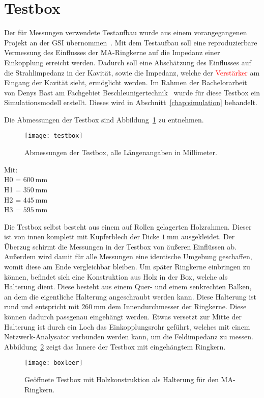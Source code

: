 \section{Testbox}
\label{sec:testbox}
Der f\"ur Messungen verwendete Testaufbau wurde aus einem vorangegangenen Projekt an der GSI \"ubernommen~\citep{harzheim2016modeling}. Mit dem Testaufbau soll eine reproduzierbare Vermessung des Einflusses der MA-Ringkerne auf die Impedanz einer Einkopplung erreicht werden. Dadurch soll eine Absch\"atzung des Einflusses auf die Strahlimpedanz in der Kavit\"at, sowie die Impedanz, welche der \textcolor{red}{Verst\"arker} am Eingang der Kavit\"at sieht, erm\"oglicht werden. Im Rahmen der Bachelorarbeit von Denys Bast am Fachgebiet Beschleunigertechnik~\citep{bast2017ba} wurde f\"ur diese Testbox ein Simulationsmodell erstellt. Dieses wird in Abschnitt~\ref{chap:simulation} behandelt.

\par
Die Abmessungen der Testbox sind Abbildung~\ref{fig:boxdimensions} zu entnehmen.
\par
\begin{figure}[htb]
	\centering
	\texttt{[image: testbox]}
	\caption{Abmessungen der Testbox, alle L\"angenangaben in Millimeter.}
	\label{fig:boxdimensions}
\end{figure}
Mit:\\
H0 = $\SI{600}{\milli\meter}$\\
H1 = $\SI{350}{\milli\meter}$\\
H2 = $\SI{445}{\milli\meter}$\\
H3 = $\SI{595}{\milli\meter}$

Die Testbox selbst besteht aus einem auf Rollen gelagerten Holzrahmen. Dieser ist von innen komplett mit Kupferblech der Dicke $\SI{1}{\milli\meter}$ ausgekleidet. Der Überzug schirmt die Messungen in der Testbox von \"au\ss{}eren Einfl\"ussen ab. Au\ss{}erdem wird damit f\"ur alle Messungen eine identische Umgebung geschaffen, womit diese am Ende vergleichbar bleiben. Um sp\"ater Ringkerne einbringen zu k\"onnen, befindet sich eine Konstruktion aus Holz in der Box, welche als Halterung dient. Diese besteht aus einem Quer- und einem senkrechten Balken, an dem die eigentliche Halterung angeschraubt werden kann. Diese Halterung ist rund und entspricht mit $\SI{260}{\milli\meter}$ dem Innendurchmesser der Ringkerne. Diese k\"onnen dadurch passgenau eingeh\"angt werden. Etwas versetzt zur Mitte der Halterung ist durch ein Loch das Einkopplungsrohr gef\"uhrt, welches mit einem Netzwerk-Analysator verbunden werden kann, um die Feldimpedanz zu messen. Abbildung~\ref{fig:leereBox} zeigt das Innere der Testbox mit eingeh\"angtem Ringkern. 
\par
\begin{figure}[htb]
	\centering
	\texttt{[image: boxleer]}
	\caption{Ge\"offnete Testbox mit Holzkonstruktion als Halterung f\"ur den MA-Ringkern.}
	\label{fig:leereBox}
\end{figure}


